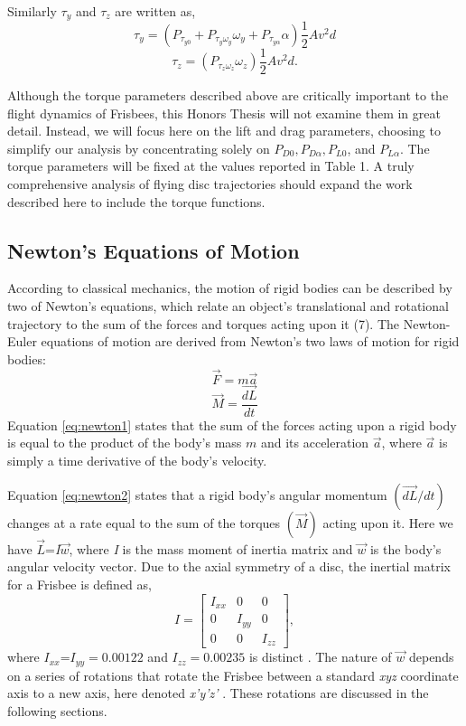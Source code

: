 \documentclass[a4paper,12pt, oneside]{article}
\begin{document}
Similarly $\tau_y$ and $\tau_z$ are written as,
\begin{equation}
  \tau_y=(P_{\tau_{y0}}+P_{\tau_y\omega_y}\omega_y+P_{\tau_{y\alpha}}\alpha)\frac{1}2Av^2d
\end{equation}
\begin{equation}
  \tau_z=(P_{\tau_z\omega_z}\omega_z)\frac{1}2Av^2d.
\end{equation}

Although the torque parameters described above are critically important to the flight dynamics of Frisbees, this Honors Thesis will not examine them in great detail. Instead, we will focus here on the lift and drag parameters, choosing to simplify our analysis by concentrating solely on $P_{D0}, P_{D\alpha}, P_{L0}$, and $P_{L\alpha}$. The torque parameters will be fixed at the values reported in Table 1. A truly comprehensive analysis of flying disc trajectories should expand the work described here to include the torque functions.

\subsection{Newton's Equations of Motion} 

According to classical mechanics, the motion of rigid bodies can be described by two of Newton's equations, which relate an object's translational and rotational trajectory to the sum of the forces and torques acting upon it (7).  The Newton-Euler equations of motion are derived from Newton's two laws of motion for rigid bodies:
\begin{equation}
  \label{eq:newton1}
  \vec{F}=\textit{m}\vec{a}
\end{equation}
\begin{equation}
  \label{eq:newton2}
  \vec{M}=\dfrac{\vec{dL}}{dt}
\end{equation}
Equation \ref{eq:newton1} states that the sum of the forces acting upon a rigid body is equal to the product of the body's mass $\textit{m}$ and its acceleration $\vec{a}$, where $\vec{a}$ is simply a time derivative of the body's velocity.  

Equation \ref{eq:newton2} states that a rigid body's angular momentum $(\vec{dL}/dt)$ changes at a rate equal to the sum of the torques $(\vec{M})$ acting upon it. Here we have $\vec{L}$=\textit{I}$\vec{w}$, where \textit{I} is the mass moment of inertia matrix and $\vec{w}$ is the body's angular velocity vector. Due to the axial symmetry of a disc, the inertial matrix for a Frisbee is defined as,  
\begin{equation*}
I=\begin{bmatrix}
I_{xx} & 0 & 0 \\
0 & I_{yy} & 0 \\ 
0 & 0 & I_{zz}
\end{bmatrix},
\end{equation*}
where $I_{xx}$=$I_{yy}=0.00122$ and $I_{zz}=0.00235$ is distinct \cite{hubbardandhummel}.  The nature of $\vec{w}$ depends on a series of rotations that rotate the Frisbee between a standard \textit{xyz} coordinate axis to a new axis, here denoted \textit{x'y'z'} \cite{H3}. These rotations are discussed in the following sections.
\end{document}
